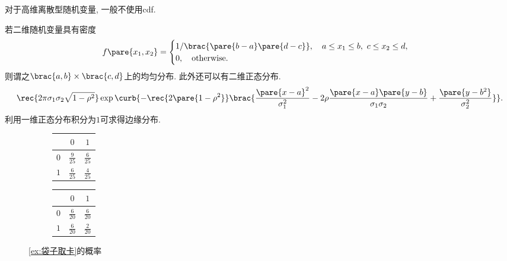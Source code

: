 \documentclass{ctexart}
\begin{document}
\begin{remark}
    对于高维离散型随机变量, 一般不使用cdf.
\end{remark}
若二维随机变量具有密度
\[ f\pare{x_1,x_2} = \begin{cases}
    1/\brac{\pare{b-a}\pare{d-c}},\quad a\le x_1 \le b,\ c\le x_2\le d,\\
    0,\quad \mathrm{otherwise}.
\end{cases} \]
则谓之$\brac{a,b}\times\brac{c,d}$上的均匀分布. 此外还可以有二维正态分布.
\begin{equation} \label{eq:二维正态分布} \rec{2\pi\sigma_1\sigma_2\sqrt{1-\rho^2}}\exp\curb{%
    -\rec{2\pare{1-\rho^2}} \brac{%
        \frac{\pare{x-a}^2}{\sigma_1^2}%
         - 2\rho \frac{\pare{x-a}\pare{y-b}}{\sigma_1\sigma_2} +%
        \frac{\pare{y-b^2}}{\sigma_2^2}%
    }%
}.
\end{equation}
利用一维正态分布积分为$1$可求得边缘分布.
        \begin{figure}[ht]
            \centering
            \begin{subfigure}{.45\textwidth}
                \centering
                \begin{tabular}{|c|c|c|}
                    \hline
                    \diagbox{$\xi$}{$\eta$} & $0$ & $1$ \\
                    \hline
                    $0$ & $\frac{9}{25}$ & $\frac{6}{25}$ \\
                    \hline
                    $1$ & $\frac{6}{25}$ & $\frac{4}{25}$ \\
                    \hline
                \end{tabular}
            \end{subfigure}
            \begin{subfigure}{.45\textwidth}
                \centering
                \begin{tabular}{|c|c|c|}
                    \hline
                    \diagbox{$\xi$}{$\eta$} & $0$ & $1$ \\
                    \hline
                    $0$ & $\frac{6}{20}$ & $\frac{6}{20}$ \\
                    \hline
                    $1$ & $\frac{6}{20}$ & $\frac{2}{20}$ \\
                    \hline
                \end{tabular}
            \end{subfigure}
            \caption{\cref{ex:袋子取卡}的概率}
            \label{fig:袋子取卡的概率}
        \end{figure}
\end{document}
